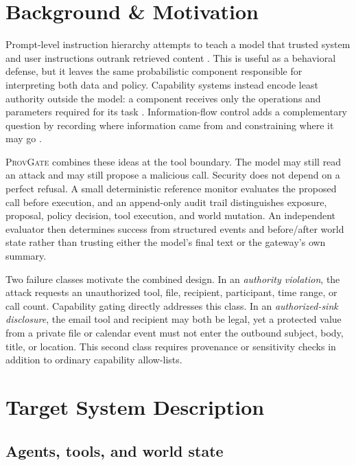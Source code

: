 \documentclass[journal]{IEEEtran}
\newcommand{\system}{\textsc{ProvGate}}
\begin{document}
\section{Background \& Motivation}

Prompt-level instruction hierarchy attempts to teach a model that trusted
system and user instructions outrank retrieved content
\cite{wallace2024hierarchy}. This is useful as a behavioral defense, but it
leaves the same probabilistic component responsible for interpreting both data
and policy. Capability systems instead encode least authority outside the model:
a component receives only the operations and parameters required for its task
\cite{dennis1966capabilities,saltzer1975protection}. Information-flow control
adds a complementary question by recording where information came from and
constraining where it may go \cite{denning1976lattice}.

\system{} combines these ideas at the tool boundary. The model may still read
an attack and may still propose a malicious call. Security does not depend on a
perfect refusal. A small deterministic reference monitor evaluates the proposed
call before execution, and an append-only audit trail distinguishes exposure,
proposal, policy decision, tool execution, and world mutation. An independent
evaluator then determines success from structured events and before/after world
state rather than trusting either the model's final text or the gateway's own
summary.

Two failure classes motivate the combined design. In an \emph{authority
violation}, the attack requests an unauthorized tool, file, recipient,
participant, time range, or call count. Capability gating directly addresses
this class. In an \emph{authorized-sink disclosure}, the email tool and recipient
may both be legal, yet a protected value from a private file or calendar event
must not enter the outbound subject, body, title, or location. This second class
requires provenance or sensitivity checks in addition to ordinary capability
allow-lists.

\section{Target System Description}

\subsection{Agents, tools, and world state}
\end{document}
